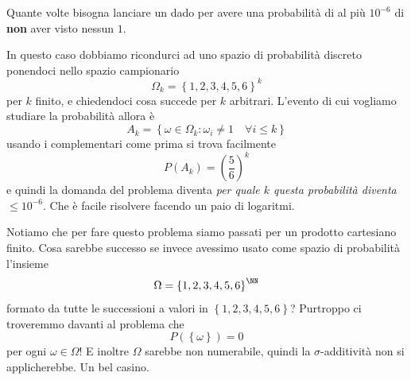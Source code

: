 \documentclass[11pt]{scrartcl}
\begin{document}
	\begin{exercise}
		Quante volte bisogna lanciare un dado per avere una probabilità di al più $10^{-6}$ di \textbf{non} aver visto nessun $1$.
		\begin{answer}
			In questo caso dobbiamo ricondurci ad uno spazio di probabilità discreto ponendoci nello spazio campionario
			$$\Omega_k=\left\{1,2,3,4,5,6\right\}^k$$
			per $k$ finito, e chiedendoci cosa succede per $k$ arbitrari. L'evento di cui vogliamo studiare la probabilità allora è
			$$A_k=\left\{\omega\in \Omega_k:\omega_i\ne 1\quad\forall i\le k\right\}$$
			usando i complementari come prima si trova facilmente
			$$P(A_k)=\left(\frac{5}{6}\right)^k$$
			e quindi la domanda del problema diventa \textit{per quale $k$ questa probabilità diventa $\le 10^{-6}$}. Che è facile risolvere facendo un paio di logaritmi.
		\end{answer}
	\end{exercise}
	Notiamo che per fare questo problema siamo passati per un prodotto cartesiano finito. Cosa sarebbe successo se invece avessimo usato come spazio di probabilità l'insieme
	$$\Omega=\left\{1,2,3,4,5,6\right\}^\NN$$
	formato da tutte le successioni a valori in $\left\{1,2,3,4,5,6\right\}$? Purtroppo ci troveremmo davanti al problema che 
	$$P(\left\{\omega\right\})=0$$
	per ogni $\omega\in\Omega$! E inoltre $\Omega$ sarebbe non numerabile, quindi la $\sigma$-additività non si applicherebbe. Un bel casino.
\end{document}
